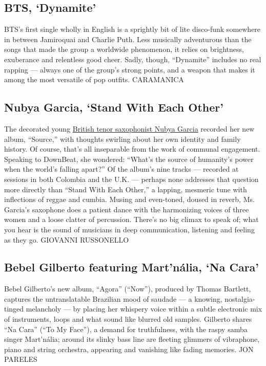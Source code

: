 \hypertarget{bts-dynamite}{%
\subsection{BTS, `Dynamite'}\label{bts-dynamite}}

BTS's first single wholly in English is a sprightly bit of lite
disco-funk somewhere in between Jamiroquai and Charlie Puth. Less
musically adventurous than the songs that made the group a worldwide
phenomenon, it relies on brightness, exuberance and relentless good
cheer. Sadly, though, ``Dynamite'' includes no real rapping --- always
one of the group's strong points, and a weapon that makes it among the
most versatile of pop outfits. CARAMANICA

\hypertarget{nubya-garcia-stand-with-each-other}{%
\subsection{Nubya Garcia, `Stand With Each
Other'}\label{nubya-garcia-stand-with-each-other}}

The decorated young
\href{https://www.nytimes3xbfgragh.onion/2020/08/17/arts/music/nubya-garcia-source.html}{British
tenor saxophonist Nubya Garcia} recorded her new album, ``Source,'' with
thoughts swirling about her own identity and family history. Of course,
that's all inseparable from the work of communal engagement. Speaking to
DownBeat, she wondered: ``What's the source of humanity's power when the
world's falling apart?'' Of the album's nine tracks --- recorded at
sessions in both Colombia and the U.K. --- perhaps none addresses that
question more directly than ``Stand With Each Other,'' a lapping,
mesmeric tune with inflections of reggae and cumbia. Musing and
even-toned, doused in reverb, Ms. Garcia's saxophone does a patient
dance with the harmonizing voices of three women and a loose clatter of
percussion. There's no big climax to speak of; what you hear is the
sound of musicians in deep communication, listening and feeling as they
go. GIOVANNI RUSSONELLO

\hypertarget{bebel-gilberto-featuring-martnuxe1lia-na-cara}{%
\subsection{Bebel Gilberto featuring Mart'nália, `Na
Cara'}\label{bebel-gilberto-featuring-martnuxe1lia-na-cara}}

Bebel Gilberto's new album, ``Agora'' (``Now''), produced by Thomas
Bartlett, captures the untranslatable Brazilian mood of saudade --- a
knowing, nostalgia-tinged melancholy --- by placing her whispery voice
within a subtle electronic mix of instruments, loops and what sound like
blurred old samples. Gilberto shares ``Na Cara'' (``To My Face''), a
demand for truthfulness, with the raspy samba singer Mart'nália; around
its slinky bass line are fleeting glimmers of vibraphone, piano and
string orchestra, appearing and vanishing like fading memories. JON
PARELES

